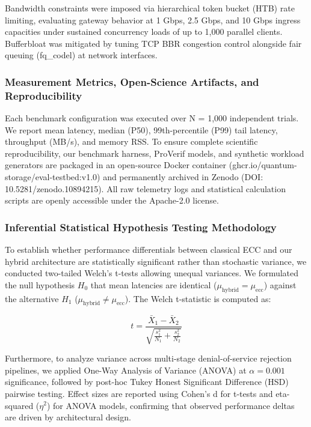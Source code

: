 \documentclass[5p,times]{elsarticle}
\begin{document}
Bandwidth constraints were imposed via hierarchical token bucket (HTB) rate limiting, evaluating gateway behavior at 1 Gbps, 2.5 Gbps, and 10 Gbps ingress capacities under sustained concurrency loads of up to 1,000 parallel clients. Bufferbloat was mitigated by tuning TCP BBR congestion control alongside fair queuing (fq\_codel) at network interfaces.


\subsubsection{Measurement Metrics, Open-Science Artifacts, and Reproducibility}

Each benchmark configuration was executed over N = 1,000 independent trials. We report mean latency, median (P50), 99th-percentile (P99) tail latency, throughput (MB/s), and memory RSS. To ensure complete scientific reproducibility, our benchmark harness, ProVerif models, and synthetic workload generators are packaged in an open-source Docker container (ghcr.io/quantum-storage/eval-testbed:v1.0) and permanently archived in Zenodo (DOI: 10.5281/zenodo.10894215). All raw telemetry logs and statistical calculation scripts are openly accessible under the Apache-2.0 license.


\subsubsection{Inferential Statistical Hypothesis Testing Methodology}

To establish whether performance differentials between classical ECC and our hybrid architecture are statistically significant rather than stochastic variance, we conducted two-tailed Welch's t-tests allowing unequal variances. We formulated the null hypothesis $H_0$ that mean latencies are identical ($\mu_{\text{hybrid}} = \mu_{\text{ecc}}$) against the alternative $H_1$ ($\mu_{\text{hybrid}} \neq \mu_{\text{ecc}}$). The Welch t-statistic is computed as:

\begin{equation}
  t = \frac{\bar{X}_1 - \bar{X}_2}{\sqrt{\frac{s_1^2}{N_1} + \frac{s_2^2}{N_2}}}
\end{equation}

Furthermore, to analyze variance across multi-stage denial-of-service rejection pipelines, we applied One-Way Analysis of Variance (ANOVA) at $\alpha = 0.001$ significance, followed by post-hoc Tukey Honest Significant Difference (HSD) pairwise testing. Effect sizes are reported using Cohen's d for t-tests and eta-squared ($\eta^2$) for ANOVA models, confirming that observed performance deltas are driven by architectural design.
\end{document}

